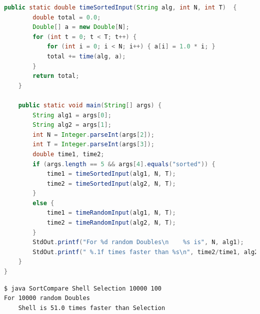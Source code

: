 \documentclass[8pt,a4paper,compress]{beamer}
\begin{document}
\begin{frame}[fragile]
\begin{lstlisting}[language=Java]
    public static double timeSortedInput(String alg, int N, int T)  {
        double total = 0.0; 
        Double[] a = new Double[N]; 
        for (int t = 0; t < T; t++) {
            for (int i = 0; i < N; i++) { a[i] = 1.0 * i; }
            total += time(alg, a); 
        } 
        return total; 
    } 

    public static void main(String[] args) { 
        String alg1 = args[0]; 
        String alg2 = args[1]; 
        int N = Integer.parseInt(args[2]);
        int T = Integer.parseInt(args[3]);
        double time1, time2;
        if (args.length == 5 && args[4].equals("sorted")) {
            time1 = timeSortedInput(alg1, N, T);
            time2 = timeSortedInput(alg2, N, T);
        }
        else {
            time1 = timeRandomInput(alg1, N, T);
            time2 = timeRandomInput(alg2, N, T);
        }
        StdOut.printf("For %d random Doubles\n    %s is", N, alg1); 
        StdOut.printf(" %.1f times faster than %s\n", time2/time1, alg2); 
    } 
}
\end{lstlisting}

\begin{lstlisting}[language={}]
$ java SortCompare Shell Selection 10000 100
For 10000 random Doubles
    Shell is 51.0 times faster than Selection
\end{lstlisting}
\end{frame}
\end{document}
